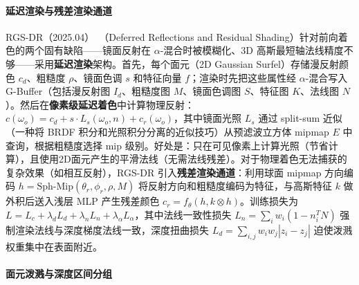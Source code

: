 \paragraph{延迟渲染与残差渲染通道}

RGS-DR（2025.04）~\cite{2504_18468}（Deferred Reflections and Residual Shading）针对前向着色的两个固有缺陷——镜面反射在 $\alpha$-混合时被模糊化、3D 高斯最短轴法线精度不够——采用\textbf{延迟渲染}架构。首先，每个面元（2D Gaussian Surfel）存储漫反射颜色 $c_d$、粗糙度 $\rho$、镜面色调 $s$ 和特征向量 $f$；渲染时先把这些属性经 $\alpha$-混合写入 G-Buffer（包括漫反射图 $I_d$、粗糙度图 $M$、镜面色调图 $S$、特征图 $K$、法线图 $N$）。然后在\textbf{像素级延迟着色}中计算物理反射：$c(\omega_o) = c_d + s \cdot L_s(\omega_o, n) + c_r(\omega_o)$，其中镜面光照 $L_s$ 通过 split-sum 近似（一种将 BRDF 积分和光照积分分离的近似技巧）从预滤波立方体 mipmap $E$ 中查询，根据粗糙度选择 mip 级别。好处是：只在可见像素上计算光照（节省计算），且使用2D面元产生的平滑法线（无需法线残差）。对于物理着色无法捕获的复杂效果（如相互反射），RGS-DR 引入\textbf{残差渲染通道}：利用球面 mipmap 方向编码 $h = \text{Sph-Mip}(\theta_r, \phi_r, \rho, M)$ 将反射方向和粗糙度编码为特征，与高斯特征 $k$ 做外积后送入浅层 MLP 产生残差颜色 $c_r = f_\theta(h, k \otimes h)$。训练损失为 $L = L_c + \lambda_d L_d + \lambda_n L_n + \lambda_\alpha L_\alpha$，其中法线一致性损失 $L_n = \sum_i w_i(1 - n_i^T N)$ 强制渲染法线与深度梯度法线一致，深度扭曲损失 $L_d = \sum_{i,j} w_i w_j |z_i - z_j|$ 迫使泼溅权重集中在表面附近。

\paragraph{面元泼溅与深度区间分组}

